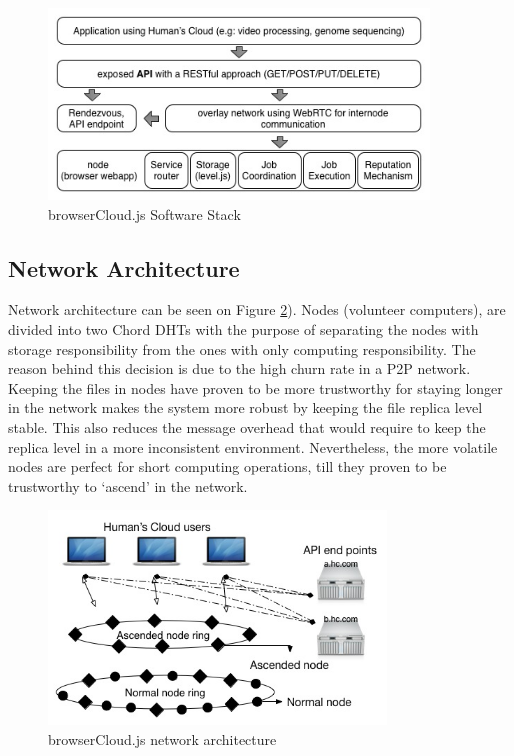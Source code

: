 \begin{figure}[h!]
  \centering
  \includegraphics[width=0.9\textwidth]{img/softwarestack.jpg}
  \caption{browserCloud.js Software Stack}
  \label{fig:softwarestack}
\end{figure}


\subsection{Network Architecture}

Network architecture can be seen on Figure \ref{fig:overallarchitecture}). Nodes (volunteer computers), are divided into two Chord DHTs with the purpose of separating the nodes with storage responsibility from the ones with only computing responsibility. The reason behind this decision is due to the high churn rate in a P2P network. Keeping the files in nodes have proven to be more trustworthy for staying longer in the network makes the system more robust by keeping the file replica level stable. This also reduces the message overhead that would require to keep the replica level in a more inconsistent environment. Nevertheless, the more volatile nodes are perfect for short computing operations, till they proven to be trustworthy to `ascend' in the network.

\begin{figure}[h!]
  \centering
  \includegraphics[width=0.8\textwidth]{img/overall.jpg}
  \caption{browserCloud.js network architecture}
  \label{fig:overallarchitecture}
\end{figure}

